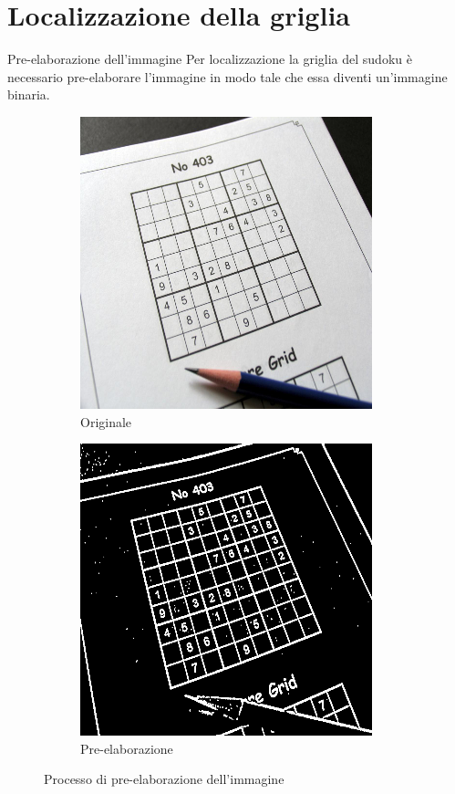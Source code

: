 \documentclass[10pt]{beamer}
\begin{document}
\section{Localizzazione della griglia}
\begin{frame}[fragile]{Pre-elaborazione dell'immagine}
    Per localizzazione la griglia del sudoku è necessario pre-elaborare
    l'immagine in modo tale che essa diventi un'immagine binaria.
%
    \begin{figure}
        \def\subwidth{0.50}
        \def\imgwidth{0.55}
        \centering
        \begin{subfigure}[b]{\subwidth\linewidth}
            \centering
            \includegraphics[width=\imgwidth\linewidth]{imgs/input.png}
            \caption{Originale}\label{subfig:input}
        \end{subfigure}%
        \begin{subfigure}[b]{\subwidth\linewidth}
            \centering
            \includegraphics[width=\imgwidth\linewidth]{imgs/process_out.png}
            \caption{Pre-elaborazione}\label{subfig:preprocess}
        \end{subfigure}
        \caption{Processo di pre-elaborazione dell'immagine}\label{fig:pre_process}
    \end{figure}
\end{frame}
\end{document}
